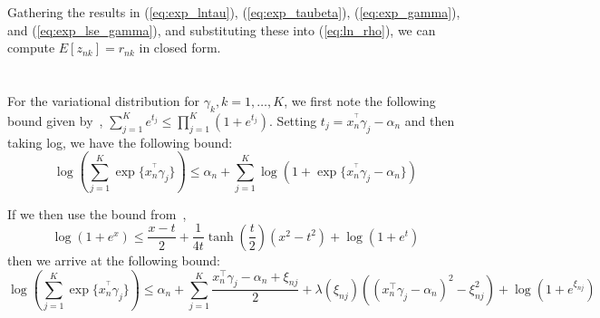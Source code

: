 \documentclass[twoside,11pt]{article}
\begin{document}
Gathering the results in (\ref{eq:exp_lntau}), (\ref{eq:exp_taubeta}), (\ref{eq:exp_gamma}), and (\ref{eq:exp_lse_gamma}), and substituting these into (\ref{eq:ln_rho}), we can compute $E[z_{nk}] = r_{nk}$ in closed form. 



\section{ } \label{app:gamma}  



For the variational distribution for $\gamma_k, k = 1, \ldots, K$, we first note the following bound given by~\cite{bouchard:07}, $\sum_{j = 1}^{K} e^{t_j} \leq \prod_{j = 1}^K (1 + e^{t_j})$. Setting $t_j = x_n^{^\intercal} \gamma_j - \alpha_{n}$ and then taking log, we have the following bound:
\begin{equation} \label{eq:log-sum-exp}
	\log \left( \sum_{j = 1}^K \exp\{ x_n^{^\intercal} \gamma_j \}\right) \leq \alpha_n + \sum_{j=1}^K \log \left( 1 + \exp \{ x_n^{^\intercal} \gamma_j - \alpha_n \}\right)
\end{equation}


If we then use the bound from~\cite{jj:2001}, $$\log(1 + e^x) \leq \frac{x - t}{2} + \frac{1}{4t} \tanh \left( \frac{t}{2} \right) (x^2 - t^2) + \log\left(1 + e^t\right)$$ then we arrive at the following bound: 
\begin{equation} \label{eq:jj_bound}
	\log \left( \sum_{j = 1}^K \exp\{ x_n^{^\intercal} \gamma_j \}\right) \leq 
\alpha_n + \sum_{j = 1}^K \frac{x_n^{\intercal} \gamma_j - \alpha_n + \xi_{nj}}{2} + \lambda(\xi_{nj}) \left( (x_n^{\intercal} \gamma_j - \alpha_n)^2 - \xi_{nj}^2\right) + \log \left( 1 + e^{\xi_{nj}}\right)
\end{equation}
\end{document}
